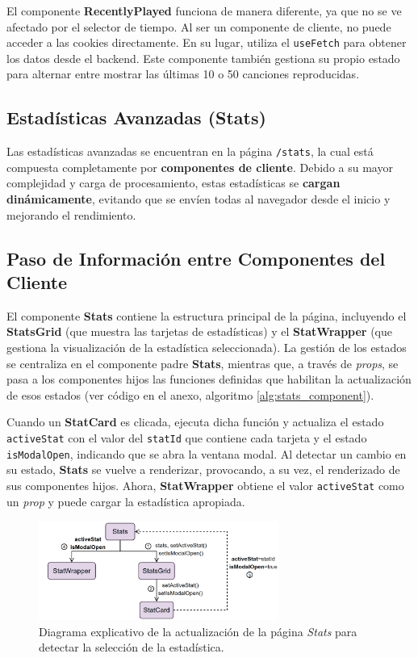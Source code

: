 El componente \textbf{RecentlyPlayed} funciona de manera diferente, ya que no se ve afectado por el selector de tiempo. Al ser un componente de cliente, no puede acceder a las cookies directamente. En su lugar, utiliza el \texttt{useFetch} para obtener los datos desde el backend. Este componente también gestiona su propio estado para alternar entre mostrar las últimas 10 o 50 canciones reproducidas.

\subsection{Estadísticas Avanzadas (Stats)}

Las estadísticas avanzadas se encuentran en la página \texttt{/stats}, la cual está compuesta completamente por \textbf{componentes de cliente}. Debido a su mayor complejidad y carga de procesamiento, estas estadísticas se \textbf{cargan dinámicamente}, evitando que se envíen todas al navegador desde el inicio y mejorando el rendimiento.

\subsection*{Paso de Información entre Componentes del Cliente}

El componente \textbf{Stats} contiene la estructura principal de la página, incluyendo el \textbf{StatsGrid} (que muestra las tarjetas de estadísticas) y el \textbf{StatWrapper} (que gestiona la visualización de la estadística seleccionada). La gestión de los estados se centraliza en el componente padre \textbf{Stats}, mientras que, a través de \textit{props}, se pasa a los componentes hijos las funciones definidas que habilitan la actualización de esos estados (ver código en el anexo, algoritmo \ref{alg:stats_component}).

Cuando un \textbf{StatCard} es clicada, ejecuta dicha función y actualiza el estado \texttt{activeStat} con el valor del \texttt{statId} que contiene cada tarjeta y el estado \texttt{isModalOpen}, indicando que se abra la ventana modal. Al detectar un cambio en su estado, \textbf{Stats} se vuelve a renderizar, provocando, a su vez, el renderizado de sus componentes hijos. Ahora, \textbf{StatWrapper} obtiene el valor \texttt{activeStat} como un \textit{prop} y puede cargar la estadística apropiada.

\begin{figure}[H]
    \centering
    \includegraphics[width=0.7\textwidth]{figures/implementacion/actualizacion_stats.png}
    \vspace{10pt}
    \caption{Diagrama explicativo de la actualización de la página \textit{Stats} para detectar la selección de la estadística.}
    \label{fig:actualizacion_stats}
\end{figure}

